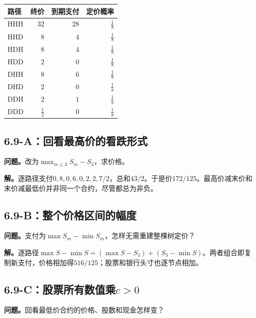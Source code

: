 \documentclass[11pt,a4paper,UTF8,fontset=fandol]{ctexart}
\begin{document}
\begin{longtable}[]{@{}lrrr@{}}
\toprule\noalign{}
路径 & 终价 & 到期支付 & 定价概率 \\
\midrule\noalign{}
\endhead
\bottomrule\noalign{}
\endlastfoot
HHH & \(32\) & \(28\) & \(\frac{1}{8}\) \\
HHD & \(8\) & \(4\) & \(\frac{1}{8}\) \\
HDH & \(8\) & \(4\) & \(\frac{1}{8}\) \\
HDD & \(2\) & \(0\) & \(\frac{1}{8}\) \\
DHH & \(8\) & \(6\) & \(\frac{1}{8}\) \\
DHD & \(2\) & \(0\) & \(\frac{1}{8}\) \\
DDH & \(2\) & \(1\) & \(\frac{1}{8}\) \\
DDD & \(\frac{1}{2}\) & \(0\) & \(\frac{1}{8}\) \\
\end{longtable}

\endgroup

\subsection{6.9-A：回看最高价的看跌形式}\label{aux56deux770bux6700ux9ad8ux4ef7ux7684ux770bux8dccux5f62ux5f0f}

\textbf{问题。}改为\(\max_{m\le3}S_m-S_3\)，求价格。

\textbf{解。}逐路径支付\(0,8,0,6,0,2,2,7/2\)，总和\(43/2\)。于是价\(\boxed{172/125}\)。最高价减末价和末价减最低价并非同一个合约，尽管都总为非负。

\subsection{6.9-B：整个价格区间的幅度}\label{bux6574ux4e2aux4ef7ux683cux533aux95f4ux7684ux5e45ux5ea6}

\textbf{问题。}支付为\(\max S_m-\min S_m\)，怎样无需重建整棵树定价？

\textbf{解。}逐路径\(\max S-\min S=(\max S-S_3)+(S_3-\min S)\)。两者组合即复制新支付，价格相加得\(\boxed{516/125}\)；股票和银行头寸也逐节点相加。

\subsection{\texorpdfstring{6.9-C：股票所有数值乘\(c>0\)}{6.9-C：股票所有数值乘c\textgreater0}}\label{cux80a1ux7968ux6240ux6709ux6570ux503cux4e58c0}

\textbf{问题。}回看最低价合约的价格、股数和现金怎样变？
\end{document}
